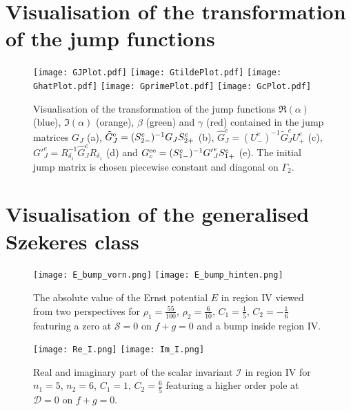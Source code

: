 \documentclass[12pt]{iopart}
\begin{document}
\appendix

\section{Visualisation of the transformation of the jump functions}

\begin{figure}[ht]
\centering
\texttt{[image: GJPlot.pdf]}\;\;
\texttt{[image: GtildePlot.pdf]}
\texttt{[image: GhatPlot.pdf]}\;\;
\texttt{[image: GprimePlot.pdf]}
\texttt{[image: GcPlot.pdf]}
\caption{Visualisation of the transformation of the jump functions $\Re(\alpha)$ (blue), $\Im(\alpha)$ (orange), $\beta$ (green) and $\gamma$ (red) contained in the jump matrices $G_J$ (a), $\tilde{G}_J^{\rm e}=(S^e_{2-})^{-1} G_J S^e_{2+}$ (b), $\hat{G}_J^e=(U^{e}_-)^{-1}\tilde{G}_J^eU^e_+$ (c), ${G'}_J^e=R_{\delta_1}^{-1}\hat{G}_J^eR_{\delta_1}$ (d) and $G_c^{\rm ee}=(S^e_{1-})^{-1} {G'}_J^e S^e_{1+}$ (e). The initial jump matrix is chosen piecewise constant and diagonal on $\Gamma_2$.}
\label{fig:VisTrafo}
\end{figure} 

\section{Visualisation of the generalised Szekeres class}

\begin{figure}[ht]
\centering
\texttt{[image: E\_bump\_vorn.png]}\qquad
\texttt{[image: E\_bump\_hinten.png]}
\caption{The absolute value of the Ernst potential $E$ in region IV viewed from two perspectives for $\rho_1=\frac{55}{100}$, $\rho_2=\frac{6}{10}$, $C_1=\frac15$, $C_2=-\frac16$ featuring a zero at $\mathcal{S}=0$ on $f+g=0$ and a bump inside region IV.}
\label{fig:E}
\end{figure} 

\begin{figure}[ht]
\centering
\texttt{[image: Re\_I.png]}\qquad
\texttt{[image: Im\_I.png]}
\caption{Real and imaginary part of the scalar invariant $\mathcal{I}$ in region IV  for $n_1=5$, $n_2=6$, $C_1=1$, $C_2=\frac65$ featuring a higher order pole at $\mathcal{D}=0$ on $f+g=0$.}
\label{fig:I}
\end{figure} 
\end{document}
